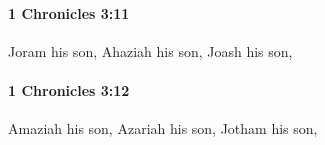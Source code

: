 		\paragraph{1 Chronicles 3:11} %
			\label{1CHRONICLES-3-11}

			Joram his son, Ahaziah his son, Joash his son,


		\paragraph{1 Chronicles 3:12} %
			\label{1CHRONICLES-3-12}

			Amaziah his son, Azariah his son, Jotham his son,



